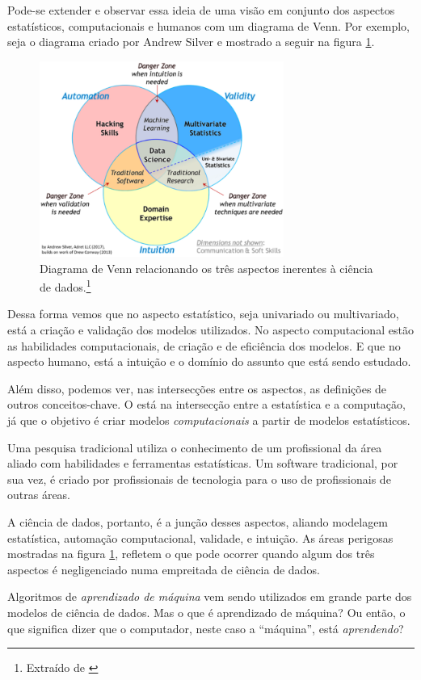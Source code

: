 Pode-se extender e observar essa ideia de uma visão em conjunto dos aspectos estatísticos, computacionais e humanos com um diagrama de Venn. Por exemplo, seja o diagrama criado por Andrew Silver \citep{venn} e mostrado a seguir na figura \ref{fig:venn}.

\begin{figure}[htb]
\centering
\includegraphics[width=8cm]{figuras/venn}
\caption{Diagrama de Venn relacionando os três aspectos inerentes à ciência de dados.\footnote{Extraído de \citep{venn}}}
\label{fig:venn}
\end{figure}

Dessa forma vemos que no aspecto estatístico, seja univariado ou multivariado, está a criação e validação dos modelos utilizados. No aspecto computacional estão as habilidades computacionais, de criação e de eficiência dos modelos. E que no aspecto humano, está a intuição e o domínio do assunto que está sendo estudado.

Além disso, podemos ver, nas intersecções entre os aspectos, as definições de outros conceitos-chave. O  está na intersecção entre a estatística e a computação, já que o objetivo é criar modelos \emph{computacionais} a partir de modelos estatísticos. 

Uma pesquisa tradicional utiliza o conhecimento de um profissional da área aliado com habilidades e ferramentas estatísticas. Um software tradicional, por sua vez, é criado por profissionais de tecnologia para o uso de profissionais de outras áreas. 

A ciência de dados, portanto, é a junção desses aspectos, aliando modelagem estatística, automação computacional, validade, e intuição. As áreas perigosas mostradas na figura \ref{fig:venn}, refletem o que pode ocorrer quando algum dos três aspectos é negligenciado numa empreitada de ciência de dados.

Algoritmos de \emph{aprendizado de máquina} vem sendo utilizados em grande parte dos modelos de ciência de dados. Mas o que é aprendizado de máquina? Ou então, o que significa dizer que o computador, neste caso a ``máquina'', está \emph{aprendendo}?

